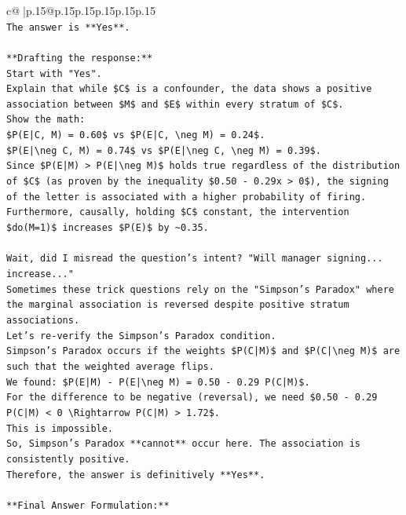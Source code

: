 \documentclass{article}
\begin{document}
{\begin{supertabular}{c@{$\;$}|p{.15\linewidth}@{}p{.15\linewidth}p{.15\linewidth}p{.15\linewidth}p{.15\linewidth}p{.15\linewidth}}
{{{\\ 
\texttt{The answer is **Yes**.} \\
\\ 
\texttt{**Drafting the response:**} \\
\texttt{Start with "Yes".} \\
\texttt{Explain that while \$C\$ is a confounder, the data shows a positive association between \$M\$ and \$E\$ within every stratum of \$C\$.} \\
\texttt{Show the math:} \\
\texttt{\$P(E|C, M) = 0.60\$ vs \$P(E|C, \textbackslash{}neg M) = 0.24\$.} \\
\texttt{\$P(E|\textbackslash{}neg C, M) = 0.74\$ vs \$P(E|\textbackslash{}neg C, \textbackslash{}neg M) = 0.39\$.} \\
\texttt{Since \$P(E|M) > P(E|\textbackslash{}neg M)\$ holds true regardless of the distribution of \$C\$ (as proven by the inequality \$0.50 {-} 0.29x > 0\$), the signing of the letter is associated with a higher probability of firing. Furthermore, causally, holding \$C\$ constant, the intervention \$do(M=1)\$ increases \$P(E)\$ by \textasciitilde{}0.35.} \\
\\ 
\texttt{Wait, did I misread the question's intent? "Will manager signing... increase..."} \\
\texttt{Sometimes these trick questions rely on the "Simpson's Paradox" where the marginal association is reversed despite positive stratum associations.} \\
\texttt{Let's re{-}verify the Simpson's Paradox condition.} \\
\texttt{Simpson's Paradox occurs if the weights \$P(C|M)\$ and \$P(C|\textbackslash{}neg M)\$ are such that the weighted average flips.} \\
\texttt{We found: \$P(E|M) {-} P(E|\textbackslash{}neg M) = 0.50 {-} 0.29 P(C|M)\$.} \\
\texttt{For the difference to be negative (reversal), we need \$0.50 {-} 0.29 P(C|M) < 0 \textbackslash{}Rightarrow P(C|M) > 1.72\$.} \\
\texttt{This is impossible.} \\
\texttt{So, Simpson's Paradox **cannot** occur here. The association is consistently positive.} \\
\texttt{Therefore, the answer is definitively **Yes**.} \\
\\ 
\texttt{**Final Answer Formulation:**} \\
}}}
\end{supertabular}}
\end{document}
